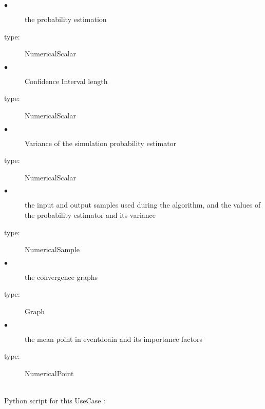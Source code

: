 {
  \begin{description}
  \item[$\bullet$] the  probability estimation
  \item[type:] NumericalScalar
  \item[$\bullet$] Confidence Interval length
  \item[type:] NumericalScalar
  \item[$\bullet$]  Variance of the simulation probability estimator
  \item[type:] NumericalScalar
  \item[$\bullet$]  the input and output samples used during the algorithm, and the values of the probability estimator and its variance
  \item[type:] NumericalSample
  \item[$\bullet$]  the convergence graphs
  \item[type:] Graph
  \item[$\bullet$]  the  mean point in eventdoain and its importance factors
  \item[type:] NumericalPoint
  \end{description}
}

\textspace\\
Python  script for this UseCase :

